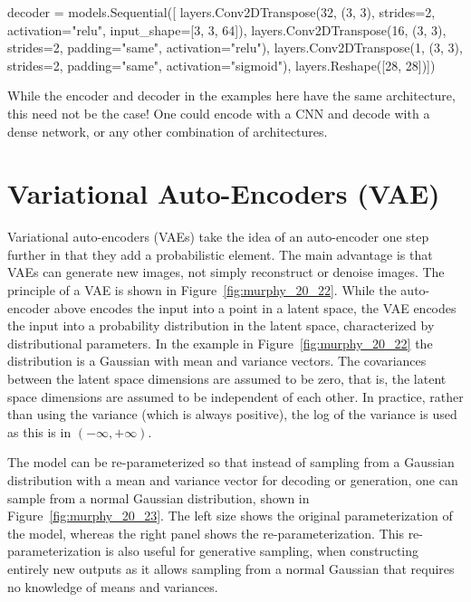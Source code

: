 \begin{pythoncode}
decoder = models.Sequential([
    layers.Conv2DTranspose(32, (3, 3), strides=2, 
               activation="relu", input_shape=[3, 3, 64]),
    layers.Conv2DTranspose(16, (3, 3), strides=2, 
               padding="same", activation="relu"),
    layers.Conv2DTranspose(1, (3, 3), strides=2, 
               padding="same", activation="sigmoid"),
    layers.Reshape([28, 28])])
\end{pythoncode}


\begin{infobox}
While the encoder and decoder in the examples here have the same architecture, this need not be the case! One could encode with a CNN and decode with a dense network, or any other combination of architectures.
\end{infobox}

\FloatBarrier

\section{Variational Auto-Encoders (VAE)}
\label{sec:vae}

Variational auto-encoders (VAEs) take the idea of an auto-encoder one step further in that they add a probabilistic element. The main advantage is that VAEs can generate new images, not simply reconstruct or denoise images. The principle of a VAE is shown in Figure~\ref{fig:murphy_20_22}. While the auto-encoder above encodes the input into a point in a latent space, the VAE encodes the input into a probability distribution in the latent space, characterized by distributional parameters. In the example in Figure~\ref{fig:murphy_20_22} the distribution is a Gaussian with mean and variance vectors. The covariances between the latent space dimensions are assumed to be zero, that is, the latent space dimensions are assumed to be independent of each other. In practice, rather than using the variance (which is always positive), the log of the variance is used as this is in $(-\infty, +\infty)$.

The model can be re-parameterized so that instead of sampling from a Gaussian distribution with a mean and variance vector for decoding or generation, one can sample from a normal Gaussian distribution, shown in Figure~\ref{fig:murphy_20_23}. The left size shows the original parameterization of the model, whereas the right panel shows the re-parameterization. This re-parameterization is also useful for generative sampling, when constructing entirely new outputs as it allows sampling from a normal Gaussian that requires no knowledge of means and variances.

